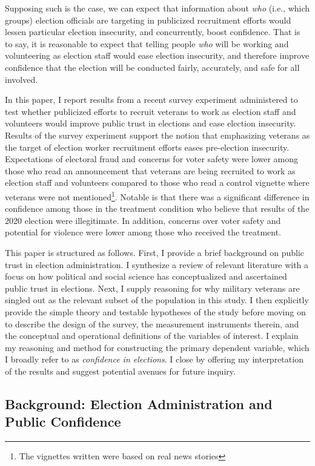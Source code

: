 \documentclass[
  12pt,
  letterpaper,
]{article}
\begin{document}
Supposing such is the case, we can expect that information about
\emph{who} (i.e., which groups) election officials are targeting in
publicized recruitment efforts would lessen particular election
insecurity, and concurrently, boost confidence. That is to say, it is
reasonable to expect that telling people \emph{who} will be working and
volunteering as election staff would ease election insecurity, and
therefore improve confidence that the election will be conducted fairly,
accurately, and safe for all involved.

In this paper, I report results from a recent survey experiment
administered to test whether publicized efforts to recruit veterans to
work as election staff and volunteers would improve public trust in
elections and ease election insecurity. Results of the survey experiment
support the notion that emphasizing veterans as the target of election
worker recruitment efforts eases pre-election insecurity. Expectations
of electoral fraud and concerns for voter safety were lower among those
who read an announcement that veterans are being recruited to work as
election staff and volunteers compared to those who read a control
vignette where veterans were not mentioned\footnote{The vignettes
  written were based on real news stories}. Notable is that there was a
significant difference in confidence among those in the treatment
condition who believe that results of the 2020 election were
illegitimate. In addition, concerns over voter safety and potential for
violence were lower among those who received the treatment.

This paper is structured as follows. First, I provide a brief background
on public trust in election administration. I synthesize a review of
relevant literature with a focus on how political and social science has
conceptualized and ascertained public trust in elections. Next, I supply
reasoning for why military veterans are singled out as the relevant
subset of the population in this study. I then explicitly provide the
simple theory and testable hypotheses of the study before moving on to
describe the design of the survey, the measurement instruments therein,
and the conceptual and operational definitions of the variables of
interest. I explain my reasoning and method for constructing the primary
dependent variable, which I broadly refer to as \emph{confidence in
elections}. I close by offering my interpretation of the results and
suggest potential avenues for future inquiry.

\subsection{Background: Election Administration and Public
Confidence}\label{background-election-administration-and-public-confidence}
\end{document}
